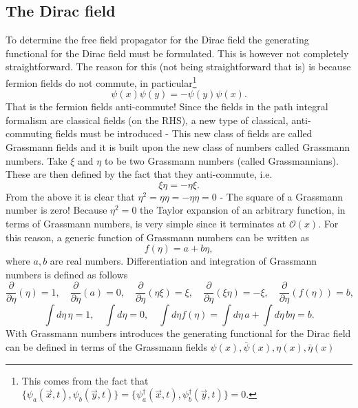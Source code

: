 \subsection*{The Dirac field} 	
To determine the free field propagator for the Dirac field the generating functional for the Dirac field must be formulated. This is however not completely straightforward. The reason for this (not being straightforward that is) is because fermion fields do not commute, in particular\footnote{This comes from the fact that $\{\psi_a(\vec{x},t),\psi_b(\vec{y},t)\}=\{\psi_a^\dagger(\vec{x},t),\psi_b^\dagger(\vec{y},t)\}=0$.}
\begin{equation}
	\psi(x)\psi(y)=-\psi(y)\psi(x).
\end{equation} 
That is the fermion fields anti-commute! Since the fields in the path integral formalism are classical fields (on the RHS), a new type of classical, anti-commuting fields must be introduced - This new class of fields are called Grassmann fields and it is built upon the new class of numbers called Grassmann numbers. Take $\xi$ and $\eta$ to be two Grassmann numbers (called Grassmannians). These are then defined by the fact that they anti-commute, i.e.
\begin{equation}
	\xi\eta=-\eta\xi.
\end{equation} 
From the above it is clear that $\eta^2=\eta\eta=-\eta\eta=0$ - The square of a Grassmann number is zero! Because $\eta^2=0$ the Taylor expansion of an arbitrary function, in terms of Grassmann numbers, is very simple since it terminates at $\mathcal{O}(x)$. For this reason, a generic function of Grassmann numbers can be written as
\begin{equation}
	f(\eta)=a+b\eta,
\end{equation} 
where $a,b$ are real numbers. Differentiation and integration of Grassmann numbers is defined as follows
\begin{equation}
	\frac{\partial }{\partial \eta}(\eta)=1, \quad \frac{\partial }{\partial \eta}(a)=0, \quad \frac{\partial }{\partial \eta}(\eta\xi)=\xi, \quad \frac{\partial }{\partial \eta}(\xi\eta)=-\xi, \quad \frac{\partial }{\partial \eta}(f(\eta))=b,
\end{equation} 
\begin{equation}
	\int d\eta \,\eta =1, \quad \int d\eta =0, \quad \int d\eta f(\eta)=\int d\eta\, a+\int d\eta \, b\eta=b.
\end{equation} 	
With Grassmann numbers introduces the generating functional for the Dirac field can be defined in terms of the Grassmann fields $\psi(x),\bar{\psi}(x),\eta(x), \bar{\eta}(x)$
